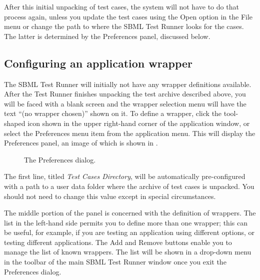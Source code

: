 \documentclass{sbmlpkgspec}
\begin{document}
After this initial unpacking of test cases, the system will not have to do that process again, unless you update the test cases using the Open option in the File menu or change the path to where the SBML Test Runner looks for the cases.  The latter is determined by the Preferences panel, discussed below.


\subsection{Configuring an application wrapper}

The SBML Test Runner will initially not have any wrapper definitions available.  After the Test Runner finishes unpacking the test archive described above, you will be faced with a blank screen and the wrapper selection menu will have the text ``(no wrapper chosen)'' shown on it.  To define a wrapper, click the tool-shaped icon shown in the upper right-hand corner of the application window, or select the Preferences menu item from the application menu.  This will display the Preferences panel, an image of which is shown in .

\begin{figure}[hbt]
  \caption{The Preferences dialog.}
  \label{preferences-1}
\end{figure}

The first line, titled \emph{Test Cases Directory}, will be automatically pre-configured with a path to a user data folder where the archive of test cases is unpacked.  You should not need to change this value except in special circumstances.

The middle portion of the panel is concerned with the definition of wrappers.  The list in the left-hand side permits you to define more than one wrapper; this can be useful, for example, if you are testing an application using different options, or testing different applications.   The Add and Remove buttons enable you to manage the list of known wrappers.  The list will be shown in a drop-down menu in the toolbar of the main SBML Test Runner window once you exit the Preferences dialog.
\end{document}
